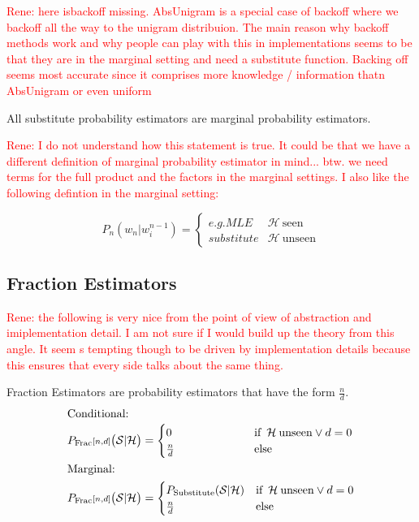 \documentclass[11pt,a4paper]{article}
\newcommand{\Seq}{\mathcal{S}}
\newcommand{\Hist}{\mathcal{H}}
\newcommand{\rp}[1]{\textcolor{red}{Rene: #1}}
\begin{document}
  \rp{here isbackoff missing. AbsUnigram is a special case of backoff where we
  backoff all the way to the unigram distribuion. The main reason why backoff
  methods work and why people can play with this in implementations seems to be
  that they are in the marginal setting and need a substitute function. Backing
  off seems most accurate since it comprises more knowledge / information thatn
  AbsUnigram or even uniform}

  All substitute probability estimators are marginal probability estimators.

  \rp{I do not understand how this statement is true. It could be that we have a
  different definition of marginal probability estimator in mind... btw. we need
  terms for the full product and the factors in the marginal settings. I also
  like the following defintion in the marginal setting:}

  \begin{equation}
    P_n(w_n|w_i^{n-1})= \begin{cases}
      e.g. MLE & \Hist \: \mathrm{seen}  \\
      substitute & \Hist \: \mathrm{unseen}
    \end{cases}
  \end{equation}


  \subsection{Fraction Estimators}

  \rp{the following is very nice from the point of view of abstraction and
  imiplementation detail. I am not sure if I would build up the theory from this
  angle. It seem s tempting though to be driven by implementation details
  because this ensures that every side talks about the same thing.}

  Fraction Estimators are probability estimators that have the form $\frac{n}{d}$.
  \begin{alignat}{2}
    \intertext{Conditional:}
    P_\mathrm{Frac}{\scriptstyle[n , d]}\big(\Seq | \Hist\big) &= \begin{cases}
      0\hphantom{_\mathrm{Substitute}(\Seq | \Hist)} & \text{if} \enspace \Hist \: \mathrm{unseen} \lor d = 0 \\
      \frac{n}{d} & \text{else}
    \end{cases} \\
    \intertext{Marginal:}
    P_\mathrm{Frac}{\scriptstyle[n , d]}\big(\Seq | \Hist\big) &= \begin{cases}
      P_\mathrm{Substitute}(\Seq | \Hist) & \text{if} \enspace \Hist \: \mathrm{unseen} \lor d = 0 \\
      \frac{n}{d} & \text{else}
    \end{cases}
  \end{alignat}
\end{document}
